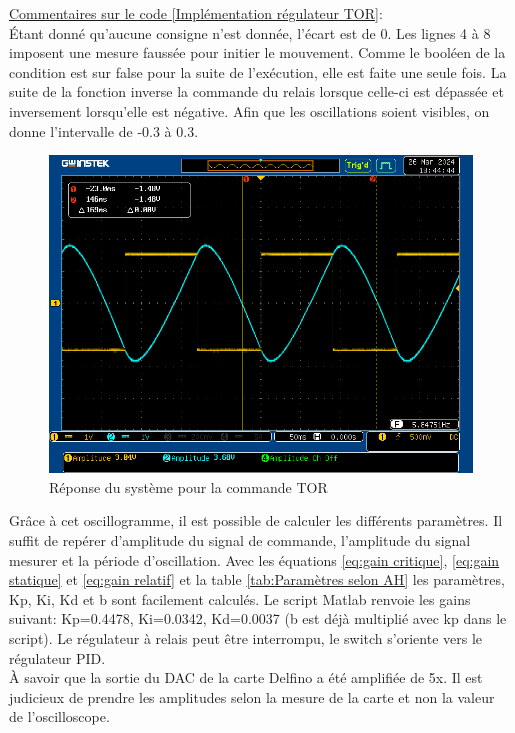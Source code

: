 \underline{Commentaires sur le code \ref{Implémentation régulateur TOR}}:\\
Étant donné qu'aucune consigne n'est donnée, l'écart est de 0. Les lignes 4 à 8 imposent une mesure faussée pour initier le mouvement. Comme le booléen de la condition est sur false pour la suite de l'exécution, elle est faite une seule fois. La suite de la fonction inverse la commande du relais lorsque celle-ci est dépassée et inversement lorsqu'elle est négative. Afin que les oscillations soient visibles, on donne l'intervalle de -0.3 à 0.3. 

\begin{figure}[h]
	\centering
	\includegraphics[width=0.8\linewidth]{img/upRegRelaisTest1}
	\caption{Réponse du système pour la commande TOR}
	\label{fig:Réponse du système pour la commande TOR}
\end{figure}

Grâce à cet oscillogramme, il est possible de calculer les différents paramètres. Il suffit de repérer d'amplitude du signal de commande, l'amplitude du signal mesurer et la période d'oscillation. Avec les équations \ref{eq:gain critique}, \ref{eq:gain statique} et \ref{eq:gain relatif} et la table \ref{tab:Paramètres selon AH} les paramètres, Kp, Ki, Kd et b sont facilement calculés. Le script Matlab renvoie les gains suivant: Kp=0.4478, Ki=0.0342, Kd=0.0037 (b est déjà multiplié avec kp dans le script). Le régulateur à relais peut être interrompu, le switch s'oriente vers le régulateur PID.\\
\`A savoir que la sortie du DAC de la carte Delfino a été amplifiée de 5x. Il est judicieux de prendre les amplitudes selon la mesure de la carte et non la valeur de l'oscilloscope.

\newpage

